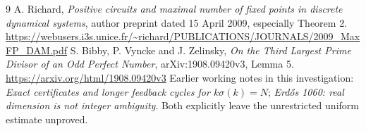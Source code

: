 \documentclass[11pt]{article}
\begin{document}
\begin{thebibliography}{9}
 A. Richard, \emph{Positive circuits and maximal number of fixed points in discrete dynamical systems}, author preprint dated 15 April 2009, especially Theorem 2.\\
\url{https://webusers.i3s.unice.fr/~richard/PUBLICATIONS/JOURNALS/2009_MaxFP_DAM.pdf}
 S. Bibby, P. Vyncke and J. Zelinsky, \emph{On the Third Largest Prime Divisor of an Odd Perfect Number}, arXiv:1908.09420v3, Lemma 5.\\
\url{https://arxiv.org/html/1908.09420v3}
 Earlier working notes in this investigation: \emph{Exact certificates and longer feedback cycles for $k\sigma(k)=N$}; \emph{Erd\H{o}s 1060: real dimension is not integer ambiguity}. Both explicitly leave the unrestricted uniform estimate unproved.
\end{thebibliography}
\end{document}
